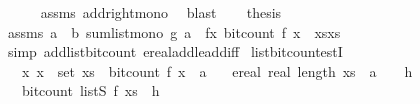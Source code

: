 \begin{isabellebody}
\ \ \ \ \isamarkupfalse%
\ assms\ add{\isacharunderscore}{\kern0pt}right{\isacharunderscore}{\kern0pt}mono\ \isamarkupfalse%
\ blast\isanewline
\isanewline
\ \ \isamarkupfalse%
\ {\isacharquery}{\kern0pt}thesis\ \ \isanewline
\ \ \ \ \isamarkupfalse%
\ assms\ a\ \ b\ sum{\isacharunderscore}{\kern0pt}list{\isacharunderscore}{\kern0pt}mono{\isacharbrackleft}{\kern0pt}\ g{\isacharequal}{\kern0pt}{\isachardoublequoteopen}{\isasymlambda}{\isacharunderscore}{\kern0pt}{\isachardot}{\kern0pt}\ a{\isacharplus}{\kern0pt}{}{\isachardoublequoteclose}\ \ f{\isacharequal}{\kern0pt}{\isachardoublequoteopen}{\isasymlambda}x{\isachardot}{\kern0pt}\ bit{\isacharunderscore}{\kern0pt}count\ {\isacharparenleft}{\kern0pt}f\ x{\isacharparenright}{\kern0pt}{\isacharplus}{\kern0pt}{}{\isachardoublequoteclose}\ \ xs{\isacharequal}{\kern0pt}{\isachardoublequoteopen}xs{\isachardoublequoteclose}{\isacharbrackright}{\kern0pt}\isanewline
\ \ \ \ \isamarkupfalse%
\ {\isacharparenleft}{\kern0pt}simp\ add{\isacharcolon}{\kern0pt}list{\isacharunderscore}{\kern0pt}bit{\isacharunderscore}{\kern0pt}count\ ereal{\isacharunderscore}{\kern0pt}add{\isacharunderscore}{\kern0pt}le{\isacharunderscore}{\kern0pt}add{\isacharunderscore}{\kern0pt}iff{}{\isacharparenright}{\kern0pt}\isanewline
{}\isamarkupfalse%
%
\endisatagproof
{\isafoldproof}%
%
\isadelimproof
\isanewline
%
\endisadelimproof
\isanewline
{}\isamarkupfalse%
\ list{\isacharunderscore}{\kern0pt}bit{\isacharunderscore}{\kern0pt}count{\isacharunderscore}{\kern0pt}estI{\isacharcolon}{\kern0pt}\isanewline
\ \ \ {\isachardoublequoteopen}{\isasymAnd}x{\isachardot}{\kern0pt}\ x\ {\isasymin}\ set\ xs\ {\isasymLongrightarrow}\ bit{\isacharunderscore}{\kern0pt}count\ {\isacharparenleft}{\kern0pt}f\ x{\isacharparenright}{\kern0pt}\ {\isasymle}\ a{\isachardoublequoteclose}\isanewline
\ \ \ {\isachardoublequoteopen}ereal\ {\isacharparenleft}{\kern0pt}real\ {\isacharparenleft}{\kern0pt}length\ xs{\isacharparenright}{\kern0pt}{\isacharparenright}{\kern0pt}\ {\isacharasterisk}{\kern0pt}\ {\isacharparenleft}{\kern0pt}a{\isacharplus}{\kern0pt}{}{\isacharparenright}{\kern0pt}\ {\isacharplus}{\kern0pt}\ {}\ {\isasymle}\ h{\isachardoublequoteclose}\isanewline
\ \ \ {\isachardoublequoteopen}bit{\isacharunderscore}{\kern0pt}count\ {\isacharparenleft}{\kern0pt}list\isactrlsub S\ f\ xs{\isacharparenright}{\kern0pt}\ {\isasymle}\ h{\isachardoublequoteclose}\isanewline

\end{isabellebody}
